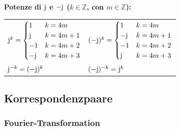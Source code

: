 \noindent\textbf{Potenze di $\mathrm{j}$ e $-\mathrm{j}$ ($k \in \mathbb{Z}$, con $m \in \mathbb{Z}$):}
\begin{center}
\begin{tabular}{ll}
    $\mathrm{j}^k = \begin{cases} 1 & k = 4m \\ \mathrm{j} & k = 4m+1 \\ -1 & k = 4m+2 \\ -\mathrm{j} & k = 4m+3 \end{cases}$ & 
    $(-\mathrm{j})^k = \begin{cases} 1 & k = 4m \\ -\mathrm{j} & k = 4m+1 \\ -1 & k = 4m+2 \\ \mathrm{j} & k = 4m+3 \end{cases}$ \\
    \noalign{\vspace{0.15cm}}
    $\mathrm{j}^{-k} = (-\mathrm{j})^k$ & 
    $(-\mathrm{j})^{-k} = \mathrm{j}^k$
\end{tabular}
\end{center}

\subsection{Korrespondenzpaare}

\subsubsection{Fourier-Transformation}

